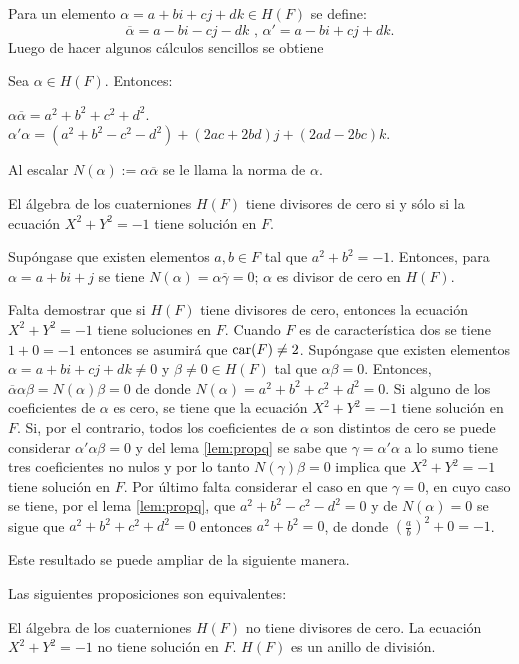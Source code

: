 Para un elemento $\alpha = a + bi + cj + dk \in H(F)$ se define:
\[
\overline{\alpha} = a - bi - cj -dk \mbox{ , } \alpha'= a - bi +cj + dk.
\]
Luego de hacer algunos cálculos sencillos se obtiene
\begin{lema}\label{lem:propq}
Sea $\alpha \in H(F)$. Entonces:
\begin{bulletList}
\newItem $\alpha\overline{\alpha} = a^2 + b^2 + c^2 + d^2$.
\newItem $\alpha'\alpha = (a^2 + b^2 - c^2 -d^2) + (2ac + 2bd)j + (2ad -2bc)k$.
\end{bulletList}
Al escalar $N(\alpha) := \alpha\overline{\alpha}$ se le llama la norma de $\alpha$.
\end{lema}
\begin{proposicion}
El álgebra de los cuaterniones $H(F)$ tiene divisores de cero si y sólo si la ecuación $X^2 + Y^2 = -1$ tiene solución en $F$.
\end{proposicion}
\begin{proof*}
Supóngase que existen elementos $a,b \in F$ tal que $a^2 + b^2 = -1$. Entonces, para $\alpha = a + bi + j$ se tiene $N(\alpha) = \alpha\overline{\gamma} = 0$; $\alpha$ es divisor de cero en $H(F)$.

Falta demostrar que si $H(F)$ tiene divisores de cero, entonces la ecuación $X^2 + Y^2 = -1$ tiene soluciones en $F$. Cuando $F$ es de característica dos se tiene $1 + 0 = -1$ entonces se asumirá que $\operatorname{car} (F) \neq 2$. Supóngase que existen elementos $\alpha = a + bi + cj + dk \neq 0$ y $\beta \neq 0 \in H(F)$ tal que $\alpha\beta = 0 $. Entonces, $\overline{\alpha}\alpha\beta = N(\alpha)\beta = 0 $ de donde $N(\alpha) = a^2 +b^2 + c^2 + d^2 = 0$. Si alguno de los coeficientes de $\alpha$ es cero, se tiene que la ecuación $X^2 + Y^2 =-1$ tiene solución en $F$. Si, por el contrario, todos los coeficientes de $\alpha$ son distintos de cero se puede considerar $\alpha'\alpha\beta = 0$ y del lema \ref{lem:propq} se sabe que $\gamma = \alpha'\alpha$ a lo sumo tiene tres coeficientes no nulos y por lo tanto $N(\gamma)\beta = 0$ implica que $X^2 + Y^2 = -1$ tiene solución en $F$. Por último falta considerar el caso en que $\gamma = 0$, en cuyo caso se tiene, por el lema \ref{lem:propq}, que $a^2 + b^2 -c^2 -d^2 = 0 $ y de $N(\alpha) = 0 $ se sigue  que $a^2 + b^2 + c^2 + d^2 = 0 $ entonces $a^2 + b^2 = 0$, de donde $\left( \frac{a}{b} \right)^2 + 0 = -1$.
\end{proof*}
Este resultado se puede ampliar de la siguiente manera.
\begin{proposicion}
Las siguientes proposiciones son equivalentes:
\begin{bulletList}
\newItem El álgebra de los cuaterniones $H(F)$ no tiene divisores de cero.
\newItem La ecuación $X^2 + Y^2 = -1$ no tiene solución en $F$.
\newItem $H(F)$ es un anillo de división.
\end{bulletList}
\end{proposicion}


